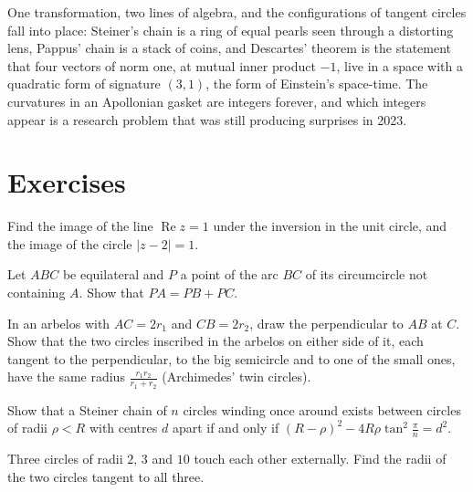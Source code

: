 \begin{beauty}
One transformation, two lines of algebra, and the configurations of tangent circles fall into place: Steiner's chain is a ring of equal
pearls seen through a distorting lens, Pappus' chain is a stack of coins, and Descartes' theorem is the statement that four vectors of norm
one, at mutual inner product $-1$, live in a space with a quadratic form of signature $(3,1)$, the form of Einstein's space-time. The
curvatures in an Apollonian gasket are integers forever, and which integers appear is a research problem that was still producing surprises
in 2023.
\end{beauty}

\section{Exercises}

\begin{exercise}[$\star$]\label{ex:invline}
Find the image of the line $\operatorname{Re}z=1$ under the inversion in the unit circle, and the image of the circle $|z-2|=1$.
\end{exercise}

\begin{exercise}[$\star$]\label{ex:vanschooten}
Let $ABC$ be equilateral and $P$ a point of the arc $BC$ of its circumcircle not containing $A$. Show that $PA=PB+PC$.
\end{exercise}

\begin{exercise}[$\star\star$]\label{ex:twins}
In an arbelos with $AC=2r_1$ and $CB=2r_2$, draw the perpendicular to $AB$ at $C$. Show that the two circles inscribed in the arbelos on
either side of it, each tangent to the perpendicular, to the big semicircle and to one of the small ones, have the same radius
$\frac{r_1r_2}{r_1+r_2}$ (Archimedes' twin circles).
\end{exercise}

\begin{exercise}[$\star\star$]\label{ex:steinerformula}
Show that a Steiner chain of $n$ circles winding once around exists between circles of radii $\rho<R$ with centres $d$ apart if and only if
$(R-\rho)^2-4R\rho\tan^2\frac\pi n=d^2$.
\end{exercise}

\begin{exercise}[$\star$]\label{ex:soddy}
Three circles of radii $2$, $3$ and $10$ touch each other externally. Find the radii of the two circles tangent to all three.
\end{exercise}

